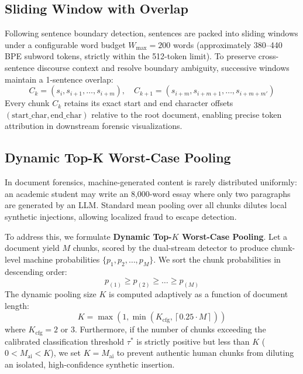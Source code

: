 \subsection{Sliding Window with Overlap}
Following sentence boundary detection, sentences are packed into sliding windows under a configurable word budget $W_{\max} = 200$ words (approximately 380--440 BPE subword tokens, strictly within the 512-token limit). To preserve cross-sentence discourse context and resolve boundary ambiguity, successive windows maintain a 1-sentence overlap:
\begin{equation}
    C_k = (s_{i}, s_{i+1}, \dots, s_{i+m}), \quad C_{k+1} = (s_{i+m}, s_{i+m+1}, \dots, s_{i+m+m'})
\end{equation}
Every chunk $C_k$ retains its exact start and end character offsets $(\text{start\_char}, \text{end\_char})$ relative to the root document, enabling precise token attribution in downstream forensic visualizations.

\subsection{Dynamic Top-K Worst-Case Pooling}
In document forensics, machine-generated content is rarely distributed uniformly: an academic student may write an 8,000-word essay where only two paragraphs are generated by an LLM. Standard mean pooling over all chunks dilutes local synthetic injections, allowing localized fraud to escape detection.

To address this, we formulate \textbf{Dynamic Top-$K$ Worst-Case Pooling}. Let a document yield $M$ chunks, scored by the dual-stream detector to produce chunk-level machine probabilities $\{p_1, p_2, \dots, p_M\}$. We sort the chunk probabilities in descending order:
\begin{equation}
    p_{(1)} \ge p_{(2)} \ge \dots \ge p_{(M)}
\end{equation}
The dynamic pooling size $K$ is computed adaptively as a function of document length:
\begin{equation}
    \label{eq:dynamic_k}
    K = \max\left(1, \min\left(K_{\text{cfg}}, \left\lceil 0.25 \cdot M \right\rceil\right)\right)
\end{equation}
where $K_{\text{cfg}} = 2$ or $3$. Furthermore, if the number of chunks exceeding the calibrated classification threshold $\tau^*$ is strictly positive but less than $K$ ($0 < M_{\text{ai}} < K$), we set $K = M_{\text{ai}}$ to prevent authentic human chunks from diluting an isolated, high-confidence synthetic insertion.

